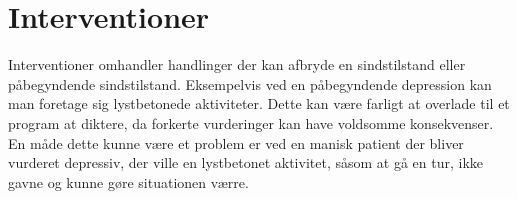 \section{Interventioner}
Interventioner omhandler handlinger der kan afbryde en sindstilstand eller påbegyndende sindstilstand.
Eksempelvis ved en påbegyndende depression kan man foretage sig lystbetonede aktiviteter.
Dette kan være farligt at overlade til et program at diktere, da forkerte vurderinger kan have voldsomme konsekvenser.
En måde dette kunne være et problem er ved en manisk patient der bliver vurderet depressiv, der ville en lystbetonet aktivitet, såsom at gå en tur, ikke gavne og kunne gøre situationen værre.
